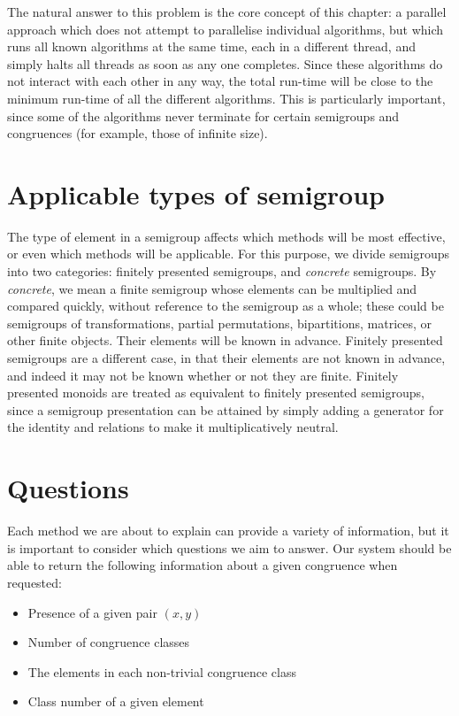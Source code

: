 The natural answer to this problem is the core concept of this chapter: a
parallel approach which does not attempt to parallelise individual algorithms,
but which runs all known algorithms at the same time, each in a different
thread, and simply halts all threads as soon as any one completes.  Since these
algorithms do not interact with each other in any way, the total run-time will
be close to the minimum run-time of all the different algorithms.  This is
particularly important, since some of the algorithms never terminate for certain
semigroups and congruences (for example, those of infinite size).

\section{Applicable types of semigroup}

The type of element in a semigroup affects which methods will be most effective,
or even which methods will be applicable.  For this purpose, we divide
semigroups into two categories: finitely presented semigroups, and
\textit{concrete} semigroups.  By \textit{concrete}, we mean a finite semigroup
whose elements can be multiplied and compared quickly, without reference to the
semigroup as a whole; these could be semigroups of transformations, partial
permutations, bipartitions, matrices, or other finite objects.  Their elements
will be known in advance.  Finitely presented semigroups are a different case,
in that their elements are not known in advance, and indeed it may not be known
whether or not they are finite.  Finitely presented monoids are treated as
equivalent to finitely presented semigroups, since a semigroup presentation can
be attained by simply adding a generator for the identity and relations to make
it multiplicatively neutral.

\section{Questions}

Each method we are about to explain can provide a variety of information, but it
is important to consider which questions we aim to answer.  Our system should be
able to return the following information about a given congruence when
requested:

\begin{itemize}
\item Presence of a given pair $(x,y)$
\item Number of congruence classes
\item The elements in each non-trivial congruence class
\item Class number of a given element
\end{itemize}

